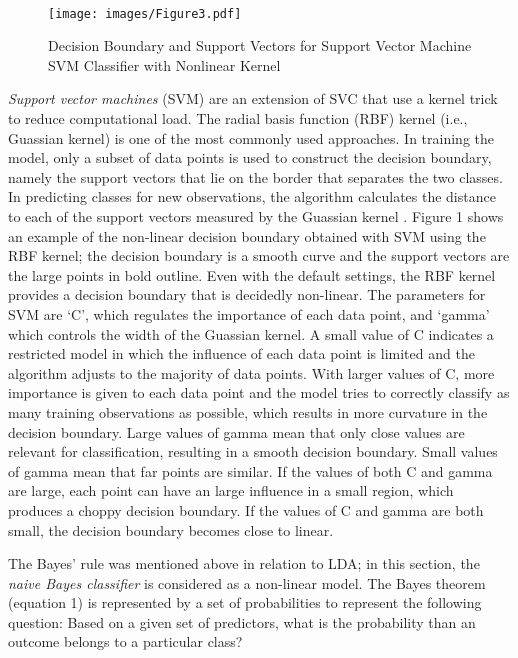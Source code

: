 \\\documentclass[sigconf]{acmart}
\begin{document}
\begin{figure}[!ht]
  \centering\texttt{[image: images/Figure3.pdf]}
  \caption{Decision Boundary and Support Vectors for Support Vector Machine 
  SVM Classifier with Nonlinear Kernel \cite{muller17}}
  \label{f:Figure3}
\end{figure}

\emph{Support vector machines} (SVM) are an extension of SVC that use a 
kernel trick to reduce computational load. The radial basis function (RBF) 
kernel (i.e., Guassian kernel) is one of the most commonly used approaches. 
In training the model, only a subset of data points is used to construct the 
decision boundary, namely the support vectors that lie on the border that 
separates the two classes. In predicting classes for new observations, the 
algorithm calculates the distance to each of the support vectors measured 
by the Guassian kernel \cite{muller17}. Figure 1 shows an example of the 
non-linear decision boundary obtained with SVM using the RBF kernel; the 
decision boundary is a smooth curve and the support vectors are the large 
points in bold outline. Even with the default settings, the RBF kernel 
provides a decision boundary that is decidedly non-linear. The parameters 
for SVM are `C', which regulates the importance of each data point, and 
`gamma' which controls the width of the Guassian kernel. A small value of 
C indicates a restricted model in which the influence of each data point is 
limited and the algorithm adjusts to the majority of data points. With larger 
values of C, more importance is given to each data point and the model tries 
to correctly classify as many training observations as possible, which results 
in more curvature in the decision boundary. Large values of gamma mean that 
only close values are relevant for classification, resulting in a smooth 
decision boundary. Small values of gamma mean that far points are similar. 
If the values of both C and gamma are large, each point can have an large 
influence in a small region, which produces a choppy decision boundary. 
If the values of C and gamma are both small, the decision boundary becomes 
close to linear.


The Bayes' rule was mentioned above in relation to LDA; in this section, the 
\emph{naive Bayes classifier} is considered as a non-linear model.
The Bayes theorem (equation 1) is represented by a set of probabilities to 
represent the following question: Based on a given set of predictors, what
is the probability than an outcome belongs to a particular class?
\end{document}
